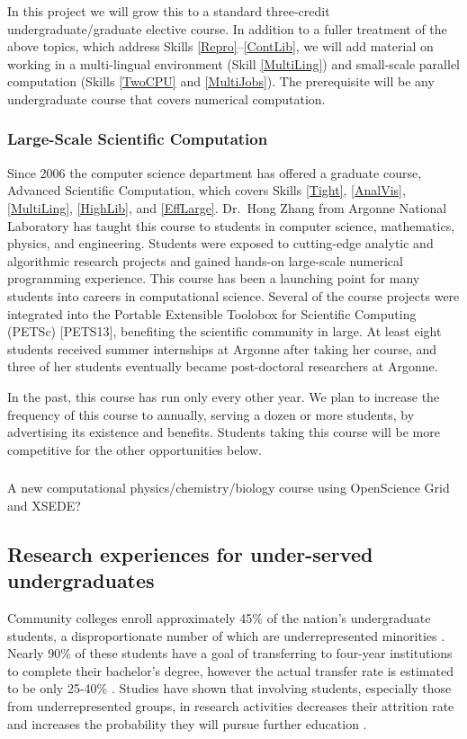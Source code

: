 \documentclass[11pt]{NSFamsart}
\begin{document}
In this project we will grow this to a standard three-credit undergraduate/graduate elective course.  In addition to a fuller treatment of the above topics, which address Skills \ref{Repro}--\ref{ContLib}, we will add material on working in a multi-lingual environment (Skill \ref{MultiLing}) and small-scale parallel computation (Skills \ref{TwoCPU} and \ref{MultiJobs}).  The prerequisite will be any undergraduate course that covers numerical computation.

\subsubsection{Large-Scale Scientific Computation} \label{LargeSC} Since 2006 the computer science department has offered a graduate course, Advanced Scientific Computation, which covers Skills \ref{Tight}, \ref{AnalVis}, \ref{MultiLing}, \ref{HighLib}, and \ref{EffLarge}.  Dr.\ Hong Zhang from Argonne National Laboratory has taught this course to students in computer science, mathematics, physics, and engineering. Students were exposed to cutting-edge analytic and algorithmic research projects and gained hands-on large-scale numerical programming experience. This course has been a launching point for many students into careers in computational science.  Several of the course projects were integrated into the Portable Extensible Toolobox for Scientific Computing (PETSc) \cite{petsc-web-page17}[PETS13], benefiting the scientific community in large. At least eight students received summer internships at Argonne after taking her course, and three of her students eventually became post-doctoral researchers at Argonne.  

In the past, this course has run only every other year.  We plan to increase the frequency of this course to annually, serving a dozen or more students, by advertising its existence and benefits.  Students taking this course will be more competitive for the other opportunities below.

\subsubsection{} A new computational physics/chemistry/biology course using OpenScience Grid and XSEDE? 

\subsection{Research experiences for under-served undergraduates} 
Community colleges enroll approximately 45\% of the nation's undergraduate students, a disproportionate number of which are underrepresented minorities \cite{KnappKG12,nsfreport13}.  Nearly 90\% of these students have a goal of transferring to four-year institutions to complete their bachelor's degree, however the actual transfer rate is estimated to be only 25-40\% \cite{HoachlanderSH03,MelguizoKA11}.  Studies have shown that involving students, especially those from underrepresented groups, in  research activities decreases  their attrition rate and increases the probability they will pursue further education \cite{BarlowV04,JonesBV10}.
\end{document}
